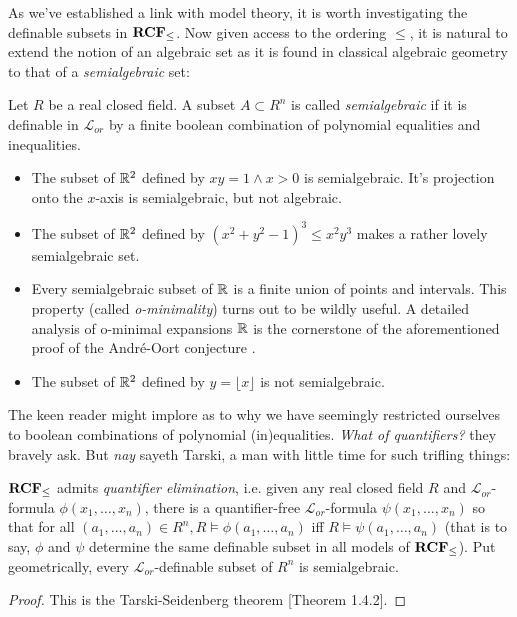 As we've established a link with model theory, it is worth investigating the definable subsets in ${\normalfont\textbf{RCF}}_{\leq}$. Now given access to the ordering $\leq$, it is natural to extend the notion of an algebraic set as it is found in classical algebraic geometry to that of a \emph{semialgebraic} set:

\begin{definition}
Let $R$ be a real closed field. A subset $A\subset R^n$ is called \emph{semialgebraic} if it is definable in $\mathcal{L}_{or}$ by a finite boolean combination of polynomial equalities and inequalities.
\end{definition}

\begin{example}
	\begin{itemize}
		\item The subset of $\mathbb{R}^2$ defined by $ xy=1\wedge x>0$ is semialgebraic. It's projection onto the $x$-axis is semialgebraic, but not algebraic.
		\item The subset of $\mathbb{R}^2$ defined by $(x^2+y^2-1)^3\leq x^2y^3$ makes a rather lovely semialgebraic set.
		\item Every semialgebraic subset of $\mathbb{R}$ is a finite union of points and intervals. This property (called \emph{o-minimality}) turns out to be wildly useful. A detailed analysis of o-minimal expansions $\mathbb{R}$ is the cornerstone of the aforementioned proof of the Andr\'e-Oort conjecture \cite{pila2022canonical}.
		\item The subset of $\mathbb{R}^2$ defined by $y=\lfloor x \rfloor$ is not semialgebraic.
	\end{itemize}
\end{example}

The keen reader might implore as to why we have seemingly restricted ourselves to boolean combinations of polynomial (in)equalities. \emph{What of quantifiers?} they bravely ask. But 
\emph{nay} sayeth Tarski, a man with little time for such trifling things:

\begin{theorem}
\label{tarski-seidenberg}
${\normalfont\textbf{RCF}}_{\leq}$ admits \emph{quantifier elimination}, i.e. given any real closed field $R$ and $\mathcal{L}_{or}$-formula $\phi(x_1,\dots, x_n)$, there is a quantifier-free $\mathcal{L}_{or}$-formula $\psi(x_1,\dots, x_n)$ so that for all $(a_1,\dots, a_n)\in R^n, R\models \phi(a_1,\dots, a_n)$ iff $R\models \psi(a_1,\dots, a_n)$ (that is to say, $\phi$ and $\psi$ determine the same definable subset in all models of ${\normalfont\textbf{RCF}}_{\leq}$). Put geometrically, every $\mathcal{L}_{or}$-definable subset of $R^n$ is semialgebraic.
\end{theorem}
\begin{proof}
This is the Tarski-Seidenberg theorem \cite{real}[Theorem 1.4.2].
\end{proof}


